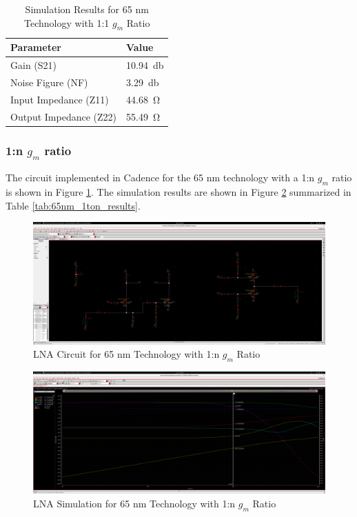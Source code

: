 \begin{table}[H]
    \centering
    \caption{Simulation Results for 65 nm Technology with 1:1 $g_m$ Ratio}
    \begin{tabularx}{\textwidth}{>{\centering\arraybackslash}X >{\centering\arraybackslash}X }
        \toprule
        \textbf{Parameter} & \textbf{Value}\\
        \midrule
        Gain (S21) & \SI{10.94}{\decibel} \\
        \midrule
        Noise Figure (NF) & \SI{3.29}{\decibel} \\
        \midrule
        Input Impedance (Z11) & \SI{44.68}{\ohm} \\
        \midrule
        Output Impedance (Z22) & \SI{55.49}{\ohm} \\
        \bottomrule
    \end{tabularx}
    \label{tab:65nm_1to1_results}
\end{table}


\subsubsection{1:n $g_m$ ratio}

The circuit implemented in Cadence for the 65 nm technology with a 1:n $g_m$ ratio is shown in Figure \ref{fig:65nm_1ton-circ}. The simulation results are shown in Figure \ref{fig:65nm_1ton} summarized in Table \ref{tab:65nm_1ton_results}.

\begin{figure}[H]
    \centering
    \includegraphics[width=1\textwidth]{Images/65nm1To35Circ.png}
    \caption{LNA Circuit for 65 nm Technology with 1:n $g_m$ Ratio}
    \label{fig:65nm_1ton-circ}
\end{figure}

\begin{figure}[H]
    \centering
    \includegraphics[width=1\textwidth]{Images/65nm1To35Final.png}
    \caption{LNA Simulation for 65 nm Technology with 1:n $g_m$ Ratio}
    \label{fig:65nm_1ton}
\end{figure}


